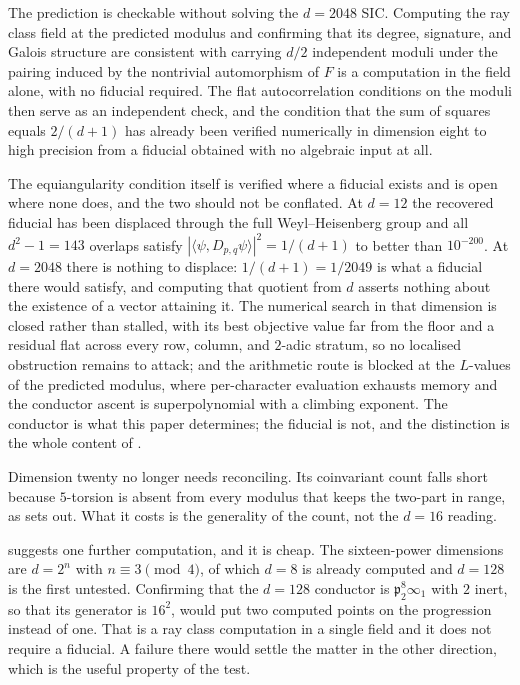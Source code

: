\documentclass[12pt,a4paper]{article}
\newcommand{\Fd}{F}
\newcommand{\pt}{\mathfrak{p}_2}
\begin{document}
The prediction is checkable without solving the $d=2048$ SIC. Computing the ray
class field at the predicted modulus and confirming that its degree, signature,
and Galois structure are consistent with carrying $d/2$ independent moduli under
the pairing induced by the nontrivial automorphism of $\Fd$ is a computation in
the field alone, with no fiducial required. The flat autocorrelation conditions
on the moduli then serve as an independent check, and the condition that the sum
of squares equals $2/(d+1)$ has already been verified numerically in dimension
eight to high precision from a fiducial obtained with no algebraic input at all.

The equiangularity condition itself is verified where a fiducial exists and is
open where none does, and the two should not be conflated. At $d=12$ the
recovered fiducial has been displaced through the full Weyl--Heisenberg group
and all $d^2-1 = 143$ overlaps satisfy $|\langle\psi,D_{p,q}\psi\rangle|^2 =
1/(d+1)$ to better than $10^{-200}$. At $d=2048$ there is nothing to displace:
$1/(d+1) = 1/2049$ is what a fiducial there would satisfy, and computing that
quotient from $d$ asserts nothing about the existence of a vector attaining it.
The numerical search in that dimension is closed rather than stalled, with its
best objective value far from the floor and a residual flat across every row,
column, and $2$-adic stratum, so no localised obstruction remains to attack;
and the arithmetic route is blocked at the $L$-values of the predicted modulus,
where per-character evaluation exhausts memory and the conductor ascent is
superpolynomial with a climbing exponent. The conductor is what this paper
determines; the fiducial is not, and the distinction is the whole content of
.

Dimension twenty no longer needs reconciling. Its coinvariant count falls short
because $5$-torsion is absent from every modulus that keeps the two-part in
range, as  sets out. What it costs is the generality of the
count, not the $d=16$ reading.

 suggests one further computation, and it is cheap.
The sixteen-power dimensions are $d = 2^{n}$ with $n \equiv 3 \pmod 4$, of which
$d=8$ is already computed and $d=128$ is the first untested. Confirming that the
$d=128$ conductor is $\pt^{8}\infty_1$ with $2$ inert, so that its generator is
$16^{2}$, would put two computed points on the progression instead of one. That
is a ray class computation in a single field and it does not require a fiducial.
A failure there would settle the matter in the other direction, which is the
useful property of the test.
\end{document}
